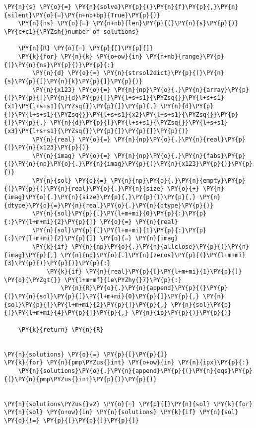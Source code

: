 \begin{Verbatim}[commandchars=\\\{\}]
    \PY{n}{s} \PY{o}{=} \PY{n}{solve}\PY{p}{(}\PY{n}{f}\PY{p}{,}\PY{n}{silent}\PY{o}{=}\PY{n+nb+bp}{True}\PY{p}{)}
    \PY{n}{ns} \PY{o}{=} \PY{n+nb}{len}\PY{p}{(}\PY{n}{s}\PY{p}{)} \PY{c+c1}{\PYZsh{}number of solutions}

    \PY{n}{R} \PY{o}{=} \PY{p}{[}\PY{p}{]}
    \PY{k}{for} \PY{n}{k} \PY{o+ow}{in} \PY{n+nb}{range}\PY{p}{(}\PY{n}{ns}\PY{p}{)}\PY{p}{:}
        \PY{n}{d} \PY{o}{=} \PY{n}{strsol2dict}\PY{p}{(}\PY{n}{s}\PY{p}{[}\PY{n}{k}\PY{p}{]}\PY{p}{)}
        \PY{n}{x123} \PY{o}{=} \PY{n}{np}\PY{o}{.}\PY{n}{array}\PY{p}{(}\PY{p}{[}\PY{n}{d}\PY{p}{[}\PY{l+s+s1}{\PYZsq{}}\PY{l+s+s1}{x1}\PY{l+s+s1}{\PYZsq{}}\PY{p}{]}\PY{p}{,} \PY{n}{d}\PY{p}{[}\PY{l+s+s1}{\PYZsq{}}\PY{l+s+s1}{x2}\PY{l+s+s1}{\PYZsq{}}\PY{p}{]}\PY{p}{,} \PY{n}{d}\PY{p}{[}\PY{l+s+s1}{\PYZsq{}}\PY{l+s+s1}{x3}\PY{l+s+s1}{\PYZsq{}}\PY{p}{]}\PY{p}{]}\PY{p}{)}
        \PY{n}{real} \PY{o}{=} \PY{n}{np}\PY{o}{.}\PY{n}{real}\PY{p}{(}\PY{n}{x123}\PY{p}{)}
        \PY{n}{imag} \PY{o}{=} \PY{n}{np}\PY{o}{.}\PY{n}{fabs}\PY{p}{(}\PY{n}{np}\PY{o}{.}\PY{n}{imag}\PY{p}{(}\PY{n}{x123}\PY{p}{)}\PY{p}{)}
        \PY{n}{sol} \PY{o}{=} \PY{n}{np}\PY{o}{.}\PY{n}{empty}\PY{p}{(}\PY{p}{(}\PY{n}{real}\PY{o}{.}\PY{n}{size} \PY{o}{+} \PY{n}{imag}\PY{o}{.}\PY{n}{size}\PY{p}{,}\PY{p}{)}\PY{p}{,} \PY{n}{dtype}\PY{o}{=}\PY{n}{real}\PY{o}{.}\PY{n}{dtype}\PY{p}{)}
        \PY{n}{sol}\PY{p}{[}\PY{l+m+mi}{0}\PY{p}{:}\PY{p}{:}\PY{l+m+mi}{2}\PY{p}{]} \PY{o}{=} \PY{n}{real}
        \PY{n}{sol}\PY{p}{[}\PY{l+m+mi}{1}\PY{p}{:}\PY{p}{:}\PY{l+m+mi}{2}\PY{p}{]} \PY{o}{=} \PY{n}{imag}
        \PY{k}{if} \PY{n}{np}\PY{o}{.}\PY{n}{allclose}\PY{p}{(}\PY{n}{imag}\PY{p}{,} \PY{n}{np}\PY{o}{.}\PY{n}{zeros}\PY{p}{(}\PY{l+m+mi}{3}\PY{p}{)}\PY{p}{)}\PY{p}{:}
            \PY{k}{if} \PY{n}{real}\PY{p}{[}\PY{l+m+mi}{1}\PY{p}{]} \PY{o}{\PYZgt{}} \PY{l+m+mf}{1e\PYZhy{}7}\PY{p}{:}
                \PY{n}{R}\PY{o}{.}\PY{n}{append}\PY{p}{(}\PY{p}{(}\PY{n}{sol}\PY{p}{[}\PY{l+m+mi}{0}\PY{p}{]}\PY{p}{,} \PY{n}{sol}\PY{p}{[}\PY{l+m+mi}{2}\PY{p}{]}\PY{p}{,} \PY{n}{sol}\PY{p}{[}\PY{l+m+mi}{4}\PY{p}{]}\PY{p}{,} \PY{n}{ip}\PY{p}{)}\PY{p}{)}

    \PY{k}{return} \PY{n}{R}


\PY{n}{solutions} \PY{o}{=} \PY{p}{[}\PY{p}{]}
\PY{k}{for} \PY{n}{pmp\PYZus{}int} \PY{o+ow}{in} \PY{n}{ipx}\PY{p}{:}
    \PY{n}{solutions}\PY{o}{.}\PY{n}{append}\PY{p}{(}\PY{n}{eqs}\PY{p}{(}\PY{n}{pmp\PYZus{}int}\PY{p}{)}\PY{p}{)}


\PY{n}{solutions\PYZus{}v2} \PY{o}{=} \PY{p}{[}\PY{n}{sol} \PY{k}{for} \PY{n}{sol} \PY{o+ow}{in} \PY{n}{solutions} \PY{k}{if} \PY{n}{sol} \PY{o}{!=} \PY{p}{[}\PY{p}{]}\PY{p}{]}



\end{Verbatim}
